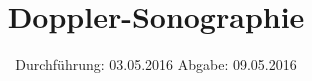 

\subject{US 3}
\title{Doppler-Sonographie}
\date{
  Durchführung: 03.05.2016
  \hspace{3em}
  Abgabe: 09.05.2016
}



\maketitle
\thispagestyle{empty}
\tableofcontents
\newpage






\printbibliography


